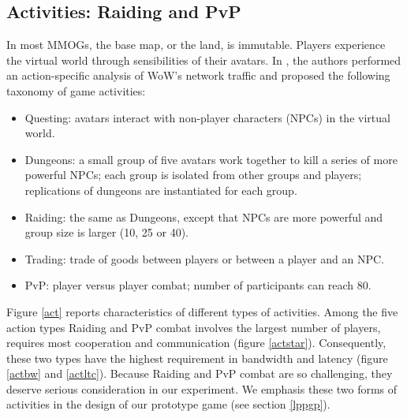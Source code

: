 \documentclass{article}
\begin{document}
\subsection{Activities: Raiding and PvP}
\label{sec:act}
In most MMOGs, the base map, or the land, is immutable. Players experience the virtual world through sensibilities of their avatars. In \cite{Suznjevic08, Suznjevic09}, the authors performed an action-specific analysis of WoW's network traffic and proposed the following taxonomy of game activities:
\begin{itemize}
\item Questing: avatars interact with non-player characters (NPCs) in the virtual world.
\item Dungeons: a small group of five avatars work together to kill a series of more powerful NPCs; each group is isolated from other groups and players; replications of dungeons are instantiated for each group.
\item Raiding: the same as Dungeons, except that NPCs are more powerful and group size is larger (10, 25 or 40).
\item Trading: trade of goods between players or between a player and an NPC.
\item PvP: player versus player combat; number of participants can reach 80.
\end{itemize}
Figure \ref{act} reports characteristics of different types of activities. Among the five action types Raiding and PvP combat involves the largest number of players, requires most cooperation and communication (figure \ref{actstar}). Consequently, these two types have the highest requirement in bandwidth and latency (figure \ref{actbw} and \ref{actltc}). Because Raiding and PvP combat are so challenging, they deserve serious consideration in our experiment. We emphasis these two forms of activities in the design of our prototype game (see section \ref{lppgp}).
\end{document}
